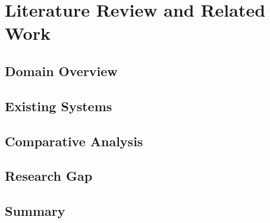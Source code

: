 \chapter{Literature Review and Related Work}
\label{chapter_backStudy}


\section{Domain Overview}
\section{Existing Systems} 
\section{Comparative Analysis} 
\section{Research Gap} 
\section{Summary}

	